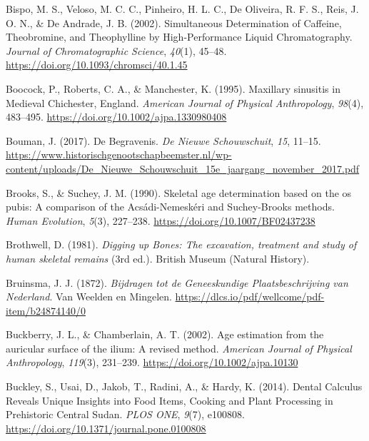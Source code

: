 \documentclass[
  letterpaper,
]{book}
\newlength{\cslhangindent}
\newlength{\cslentryspacingunit} %
\newenvironment{CSLReferences}[2] %
 {%
  \setlength{\parindent}{0pt}
  \ifodd #1
  \let\oldpar\par
  \def\par{\hangindent=\cslhangindent\oldpar}
  \fi
  \setlength{\parskip}{#2\cslentryspacingunit}
 }%
 {}
\begin{document}
\begin{CSLReferences}{1}{0}
\leavevmode{}%
Bispo, M. S., Veloso, M. C. C., Pinheiro, H. L. C., De Oliveira, R. F.
S., Reis, J. O. N., \& De Andrade, J. B. (2002). Simultaneous
{Determination} of {Caffeine}, {Theobromine}, and {Theophylline} by
{High-Performance Liquid Chromatography}. \emph{Journal of
Chromatographic Science}, \emph{40}(1), 45--48.
\url{https://doi.org/10.1093/chromsci/40.1.45}

\leavevmode{}%
Boocock, P., Roberts, C. A., \& Manchester, K. (1995). Maxillary
sinusitis in {Medieval Chichester}, {England}. \emph{American Journal of
Physical Anthropology}, \emph{98}(4), 483--495.
\url{https://doi.org/10.1002/ajpa.1330980408}

\leavevmode{}%
Bouman, J. (2017). De Begravenis. \emph{De Nieuwe Schouwschuit},
\emph{15}, 11--15.
\url{https://www.historischgenootschapbeemster.nl/wp-content/uploads/De_Nieuwe_Schouwschuit_15e_jaargang_november_2017.pdf}

\leavevmode{}%
Brooks, S., \& Suchey, J. M. (1990). Skeletal age determination based on
the os pubis: {A} comparison of the {Acsádi-Nemeskéri} and
{Suchey-Brooks} methods. \emph{Human Evolution}, \emph{5}(3), 227--238.
\url{https://doi.org/10.1007/BF02437238}

\leavevmode{}%
Brothwell, D. (1981). \emph{Digging up {Bones}: {The} excavation,
treatment and study of human skeletal remains} (3rd ed.). {British
Museum (Natural History)}.

\leavevmode{}%
Bruinsma, J. J. (1872). \emph{Bijdragen tot de {Geneeskundige
Plaatsbeschrijving} van {Nederland}}. {Van Weelden en Mingelen}.
\url{https://dlcs.io/pdf/wellcome/pdf-item/b24874140/0}

\leavevmode{}%
Buckberry, J. L., \& Chamberlain, A. T. (2002). Age estimation from the
auricular surface of the ilium: A revised method. \emph{American Journal
of Physical Anthropology}, \emph{119}(3), 231--239.
\url{https://doi.org/10.1002/ajpa.10130}

\leavevmode{}%
Buckley, S., Usai, D., Jakob, T., Radini, A., \& Hardy, K. (2014).
Dental {Calculus Reveals Unique Insights} into {Food Items}, {Cooking}
and {Plant Processing} in {Prehistoric Central Sudan}. \emph{PLOS ONE},
\emph{9}(7), e100808. \url{https://doi.org/10.1371/journal.pone.0100808}


\end{CSLReferences}
\end{document}
